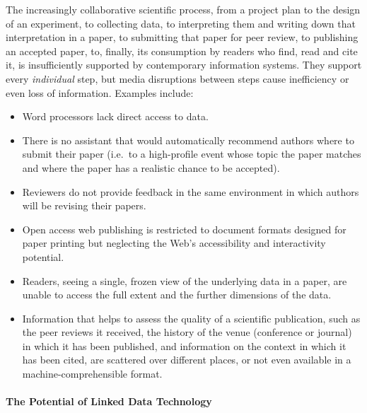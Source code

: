 \documentclass[a4paper,USenglish]{dagrep}
\begin{document}
The increasingly collaborative scientific process, from a project plan to the
design of an experiment, to collecting data, to interpreting them and writing
down that interpretation in a paper, to submitting that paper for peer review,
to publishing an accepted paper, to, finally, its consumption by readers who
find, read and cite it, is insufficiently supported by contemporary information
systems.
They support every \emph{individual} step, but media disruptions between steps
cause inefficiency or even loss of information.
Examples include:
\begin{itemize}
\item Word processors lack direct access to data.
\item There is no assistant that would automatically recommend authors where to
submit their paper (i.e.\ to a high-profile event whose topic the paper matches
and where the paper has a realistic chance to be accepted).
\item Reviewers do not provide feedback in the same environment in which authors
will be revising their papers.
\item Open access web publishing is restricted to document formats designed for
paper printing but neglecting the Web's accessibility and interactivity potential.
\item Readers, seeing a single, frozen view of the underlying data in a paper,
are unable to access the full extent and the further dimensions of the data.
\item Information that helps to assess the quality of a scientific publication,
such as the peer reviews it received, the history of the venue (conference or
journal) in which it has been published, and information on the context in which
it has been cited, are scattered over different places, or not even available in
a machine-comprehensible format.
\end{itemize}

\paragraph*{The Potential of Linked Data Technology}
\end{document}
